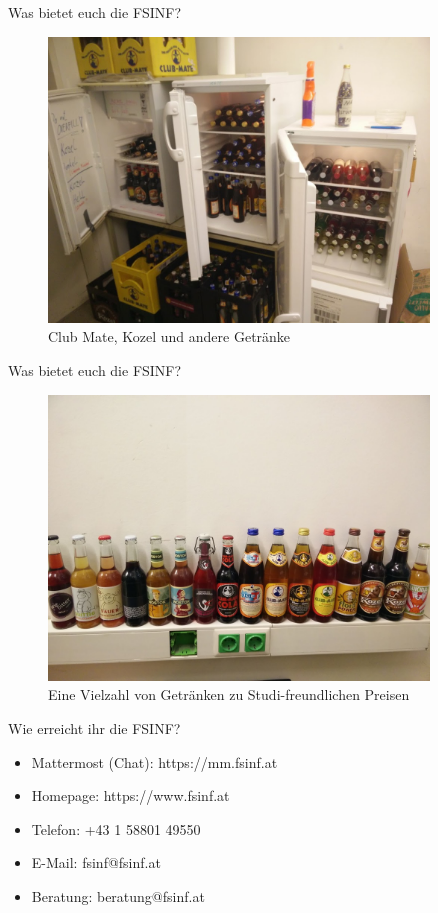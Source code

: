 \documentclass{beamer}
\begin{document}
\begin{frame}{Was bietet euch die FSINF?}
    \begin{figure}[htp]
        \centering
        \includegraphics[width=0.9\textwidth]{kuehlschrank.jpg}
        \caption{Club Mate, Kozel und andere Getränke}
    \end{figure}
\end{frame}

\begin{frame}{Was bietet euch die FSINF?}
    \begin{figure}[htp]
        \centering
        \includegraphics[width=0.9\textwidth]{getraenke.jpg}
        \caption{Eine Vielzahl von Getränken zu Studi-freundlichen Preisen}
    \end{figure}
\end{frame}

\begin{frame}{Wie erreicht ihr die FSINF?}
    \begin{itemize}
        \item Mattermost (Chat): https://mm.fsinf.at
        \item Homepage: https://www.fsinf.at
        \item Telefon: +43 1 58801 49550
        \item E-Mail: fsinf@fsinf.at
        \item Beratung: beratung@fsinf.at
    \end{itemize}
\end{frame}
\end{document}
